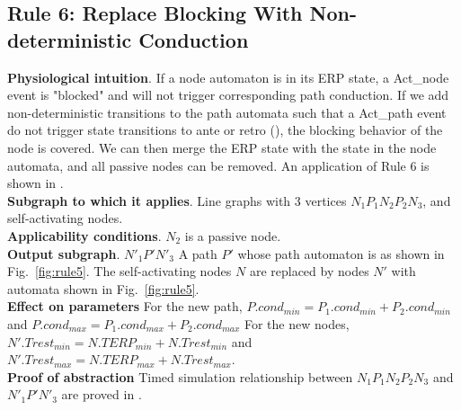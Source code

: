 \subsection{Rule 6: Replace Blocking With Non-deterministic Conduction}
\textbf{Physiological intuition}. 
If a node automaton is in its \textsf{ERP} state, a \textsf{Act\_node} event is "blocked" and will not trigger corresponding path conduction. If we add non-deterministic transitions to the path automata such that a \textsf{Act\_path} event do not trigger state transitions to \textsf{ante} or \textsf{retro} (), the blocking behavior of the node is covered. We can then merge the \textsf{ERP} state with the  state in the node automata, and all passive nodes can be removed. An application of Rule 6 is shown in .\\
\textbf{Subgraph to which it applies}.
Line graphs with 3 vertices $N_1 P_1 N_2 P_2 N_3$, and self-activating nodes.\\
\textbf{Applicability conditions}.
$N_2$ is a passive node.\\
\textbf{Output subgraph}.
$N'_1 P' N'_3$
A path $P'$ whose path automaton is as shown in Fig.~\ref{fig:rule5}.
The self-activating nodes $N$ are replaced by nodes $N'$ with automata shown in Fig.~\ref{fig:rule5}.\\
\textbf{Effect on parameters}
For the new path, $P.cond_{min}=P_1.cond_{min}+P_2.cond_{min}$ and 
$P.cond_{max}=P_1.cond_{max}+P_2.cond_{max}$
For the new nodes, $N'.Trest_{min}=N.TERP_{min}+N.Trest_{min}$ and 
$N'.Trest_{max}=N.TERP_{max}+N.Trest_{max}$.\\
\textbf{Proof of abstraction} Timed simulation relationship between $N_1 P_1 N_2 P_2 N_3$ and $N'_1 P' N'_3$ are proved in \cite{sttt13}.

